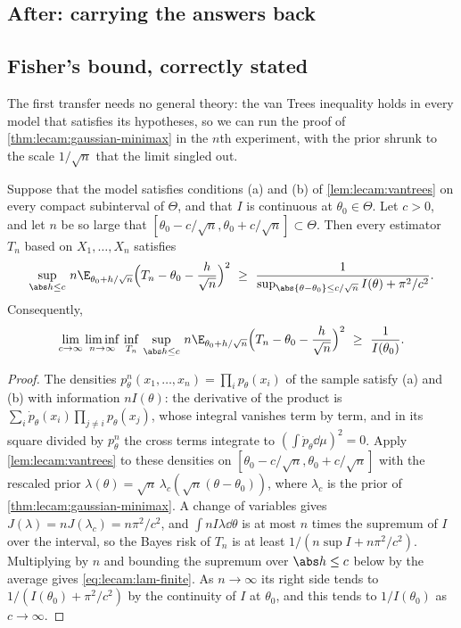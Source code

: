 \begin{refsection}
\section{After: carrying the answers back}\label{sec:lecam:transfer}

\subsection{Fisher's bound, correctly stated}

The first transfer needs no general theory: the van Trees inequality holds in every model that satisfies its hypotheses, so we can run the proof of \cref{thm:lecam:gaussian-minimax} in the $n$th experiment, with the prior shrunk to the scale $1/\sqrt n$ that the limit singled out.

\begin{theorem}\label{thm:lecam:lam-quadratic}
Suppose that the model satisfies conditions (a) and (b) of \cref{lem:lecam:vantrees} on every compact subinterval of $\Theta$, and that $I$ is continuous at $\theta_0\in\Theta$. Let $c>0$, and let $n$ be so large that $[\theta_0-c/\sqrt n,\theta_0+c/\sqrt n]\subset\Theta$. Then every estimator $T_n$ based on $X_1,\dots,X_n$ satisfies
\begin{equation}\label{eq:lecam:lam-finite}
  \sup_{\abs h\le c}\,n\E_{\theta_0+h/\sqrt n}\Big(T_n-\theta_0-\frac h{\sqrt n}\Big)^2\ \ge\ \frac1{\sup_{\abs{\theta-\theta_0}\le c/\sqrt n}I(\theta)+\pi^2/c^2}.
\end{equation}
Consequently,
\[
  \lim_{c\to\infty}\liminf_{n\to\infty}\,\inf_{T_n}\,\sup_{\abs h\le c}\,n\E_{\theta_0+h/\sqrt n}\Big(T_n-\theta_0-\frac h{\sqrt n}\Big)^2\ \ge\ \frac1{I(\theta_0)}.
\]
\end{theorem}

\begin{proof}
The densities $p^n_\theta(x_1,\dots,x_n)=\prod_ip_\theta(x_i)$ of the sample satisfy (a) and (b) with information $nI(\theta)$: the derivative of the product is $\sum_i\dot p_\theta(x_i)\prod_{j\ne i}p_\theta(x_j)$, whose integral vanishes term by term, and in its square divided by $p^n_\theta$ the cross terms integrate to $(\int\dot p_\theta\dd\mu)^2=0$. Apply \cref{lem:lecam:vantrees} to these densities on $[\theta_0-c/\sqrt n,\theta_0+c/\sqrt n]$ with the rescaled prior $\lambda(\theta)=\sqrt n\,\lambda_c(\sqrt n(\theta-\theta_0))$, where $\lambda_c$ is the prior of \cref{thm:lecam:gaussian-minimax}. A change of variables gives $J(\lambda)=nJ(\lambda_c)=n\pi^2/c^2$, and $\int nI\lambda\dd\theta$ is at most $n$ times the supremum of $I$ over the interval, so the Bayes risk of $T_n$ is at least $1/(n\sup I+n\pi^2/c^2)$. Multiplying by $n$ and bounding the supremum over $\abs h\le c$ below by the average gives \eqref{eq:lecam:lam-finite}. As $n\to\infty$ its right side tends to $1/(I(\theta_0)+\pi^2/c^2)$ by the continuity of $I$ at $\theta_0$, and this tends to $1/I(\theta_0)$ as $c\to\infty$.
\end{proof}


\end{refsection}
